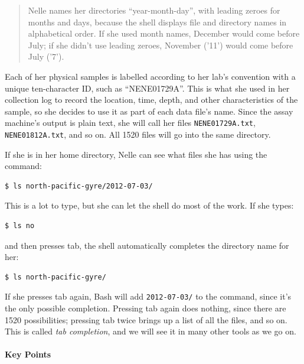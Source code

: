 \documentclass[]{book}
\newcommand{\gdef}[2]{\emph{#2}}
\begin{document}
\begin{quote}
Nelle names her directories ``year-month-day'', with leading zeroes for
months and days, because the shell displays file and directory names in
alphabetical order. If she used month names, December would come before
July; if she didn't use leading zeroes, November ('11') would come
before July ('7').
\end{quote}

Each of her physical samples is labelled according to her lab's
convention with a unique ten-character ID, such as ``NENE01729A''. This
is what she used in her collection log to record the location, time,
depth, and other characteristics of the sample, so she decides to use it
as part of each data file's name. Since the assay machine's output is
plain text, she will call her files \texttt{NENE01729A.txt},
\texttt{NENE01812A.txt}, and so on. All 1520 files will go into the same
directory.

If she is in her home directory, Nelle can see what files she has using
the command:

\begin{verbatim}
$ ls north-pacific-gyre/2012-07-03/
\end{verbatim}

This is a lot to type, but she can let the shell do most of the work. If
she types:

\begin{verbatim}
$ ls no
\end{verbatim}

and then presses tab, the shell automatically completes the directory
name for her:

\begin{verbatim}
$ ls north-pacific-gyre/
\end{verbatim}

If she presses tab again, Bash will add \texttt{2012-07-03/} to the
command, since it's the only possible completion. Pressing tab again
does nothing, since there are 1520 possibilities; pressing tab twice
brings up a list of all the files, and so on. This is called
\gdef{g:tab-completion}{tab completion}, and we will see it in many
other tools as we go on.

\mbox{}\paragraph{Key Points}
\end{document}
